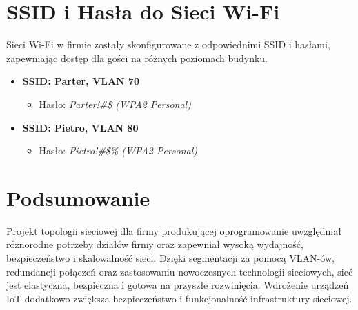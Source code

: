 \section{SSID i Hasła do Sieci Wi-Fi}
Sieci Wi-Fi w firmie zostały skonfigurowane z odpowiednimi SSID i hasłami, zapewniając dostęp dla gości na różnych poziomach budynku.
\begin{itemize}
    \item \textbf{SSID: Parter, VLAN 70}
    \begin{itemize}
        \item Hasło: \textit{Parter!\@\#\$ (WPA2 Personal)}
    \end{itemize}
    \item \textbf{SSID: Pietro, VLAN 80}
    \begin{itemize}
        \item Hasło: \textit{Pietro!\@\#\$\% (WPA2 Personal)}
    \end{itemize}
\end{itemize}

\section{Podsumowanie}
Projekt topologii sieciowej dla firmy produkującej oprogramowanie uwzględniał różnorodne potrzeby działów firmy oraz zapewniał wysoką wydajność, bezpieczeństwo i skalowalność sieci. Dzięki segmentacji za pomocą VLAN-ów, redundancji połączeń oraz zastosowaniu nowoczesnych technologii sieciowych, sieć jest elastyczna, bezpieczna i gotowa na przyszłe rozwinięcia. Wdrożenie urządzeń IoT dodatkowo zwiększa bezpieczeństwo i funkcjonalność infrastruktury sieciowej.
